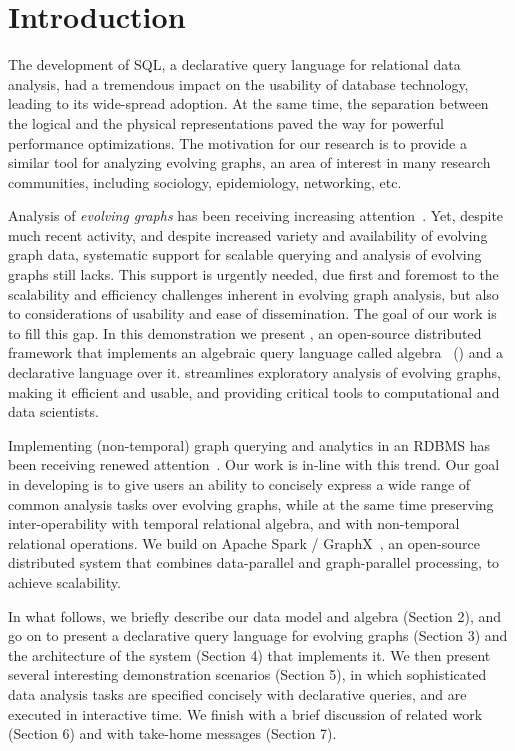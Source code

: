 \section{Introduction}
\label{sec:intro}

The development of SQL, a declarative query language for relational
data analysis, had a tremendous impact on the usability of database
technology, leading to its wide-spread adoption. At the same time, the
separation between the logical and the physical representations paved
the way for powerful performance optimizations. The motivation for our
research is to provide a similar tool for analyzing evolving graphs,
an area of interest in many research communities, including sociology,
epidemiology, networking, etc.

Analysis of {\em evolving graphs} has been receiving increasing
attention~\cite{DBLP:journals/csur/AggarwalS14,Miao2015,Ren2011,Semertzidis2015}.
Yet, despite much recent activity, and despite increased variety and
availability of evolving graph data, systematic support for scalable
querying and analysis of evolving graphs still lacks.  This support is
urgently needed, due first and foremost to the scalability and
efficiency challenges inherent in evolving graph analysis, but also to
considerations of usability and ease of dissemination.  The goal of
our work is to fill this gap.  In this demonstration we present
\sys, an open-source distributed framework that implements an
algebraic query language called \tg algebra~\cite{PortalarXiv2016}
(\tga) and a declarative language \ql over it. \sys streamlines
exploratory analysis of evolving graphs, making it efficient and
usable, and providing critical tools to computational and data
scientists.

Implementing (non-temporal) graph querying and analytics in an RDBMS
has been receiving renewed
attention~\cite{DBLP:conf/sigmod/AbergerTOR16,DBLP:conf/sigmod/SunFSKHX15,DBLP:journals/pvldb/Xirogiannopoulos15}.
Our work is in-line with this trend.  Our goal in developing \sys is
to give users an ability to concisely express a wide range of common
analysis tasks over evolving graphs, while at the same time preserving
inter-operability with temporal relational algebra, and with
non-temporal relational operations.  We build on Apache Spark /
GraphX~\cite{DBLP:conf/osdi/GonzalezXDCFS14}, an open-source
distributed system that combines data-parallel and graph-parallel
processing, to achieve scalability.

In what follows, we briefly describe our data model and algebra
(Section 2), and go on to present a declarative query language for
evolving graphs (Section 3) and the architecture of the \sys system
(Section 4) that implements it. We then present several interesting
demonstration scenarios (Section 5), in which sophisticated data
analysis tasks are specified concisely with declarative \ql queries,
and are executed in interactive time.  We finish with a brief
discussion of related work (Section 6) and with take-home messages
(Section 7).


